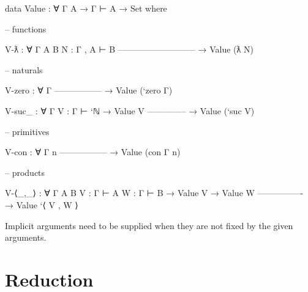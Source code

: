 \begin{fence}
\begin{code}
data Value : ∀ {Γ A} → Γ ⊢ A → Set where

  -- functions

  V-ƛ : ∀ {Γ A B} {N : Γ , A ⊢ B}
      ---------------------------
    → Value (ƛ N)

  -- naturals

  V-zero : ∀ {Γ}
      -----------------
    → Value (`zero {Γ})

  V-suc_ : ∀ {Γ} {V : Γ ⊢ `ℕ}
    → Value V
      --------------
    → Value (`suc V)

  -- primitives

  V-con : ∀ {Γ n}
      -----------------
    → Value (con {Γ} n)

  -- products

  V-⟨_,_⟩ : ∀ {Γ A B} {V : Γ ⊢ A} {W : Γ ⊢ B}
    → Value V
    → Value W
      ----------------
    → Value `⟨ V , W ⟩
\end{code}
\end{fence}

Implicit arguments need to be supplied when they are not fixed by the
given arguments.

\hypertarget{reduction-9}{%
\section{Reduction}\label{reduction-9}}

